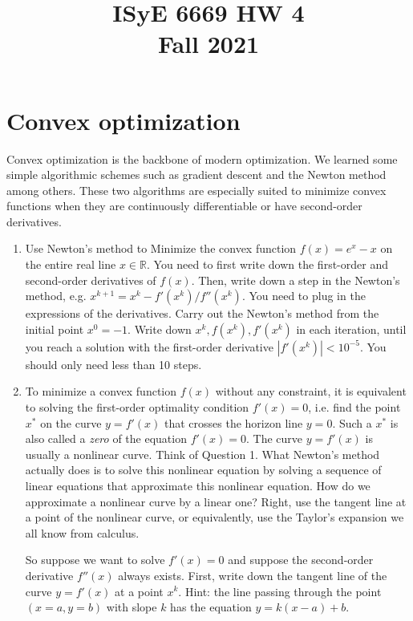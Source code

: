 \documentclass{article}
\title{ISyE 6669 HW 4 \\
Fall 2021}
\date{}
\def\R{\mathbb{R}}
\begin{document}
\maketitle


\noindent

\section{Convex optimization}
Convex optimization is the backbone of modern optimization. We learned some simple algorithmic schemes such as gradient descent and the Newton method among others. These two algorithms are especially suited to minimize convex functions when they are continuously differentiable or have second-order derivatives.

\begin{enumerate}
    \item Use Newton's method to Minimize the convex function $f(x)=e^x-x$ on the entire real line $x\in\R$. You need to first write down the first-order and second-order derivatives of $f(x)$. Then, write down a step in the Newton's method, e.g. $x^{k+1} = x^k - f'(x^k)/f''(x^k)$. You need to plug in the expressions of the derivatives. Carry out the Newton's method from the initial point $x^0 = -1$. Write down $x^k, f(x^k), f'(x^k)$ in each iteration, until you reach a solution with the first-order derivative $|f'(x^k)|<10^{-5}$. You should only need less than 10 steps.
    
    \item To minimize a convex function $f(x)$ without any constraint, it is equivalent to solving the first-order optimality condition $f'(x)=0$, i.e. find the point $x^*$ on the curve $y=f'(x)$ that crosses the horizon line $y=0$. Such a $x^*$ is also called a \emph{zero} of the equation $f'(x)=0$. The curve $y=f'(x)$ is usually a nonlinear curve. Think of Question 1. What Newton's method actually does is to solve this nonlinear equation by solving a sequence of linear equations that approximate this nonlinear equation. How do we approximate a nonlinear curve by a linear one? Right, use the tangent line at a point of the nonlinear curve, or equivalently, use the Taylor's expansion we all know from calculus. 
    
    So suppose we want to solve $f'(x)=0$ and suppose the second-order derivative $f''(x)$ always exists. First, write down the tangent line of the curve $y=f'(x)$ at a point $x^k$. Hint: the line passing through the point $(x=a,y=b)$ with slope $k$ has the equation $y=k(x-a)+b$. 
    

\end{enumerate}
\end{document}

